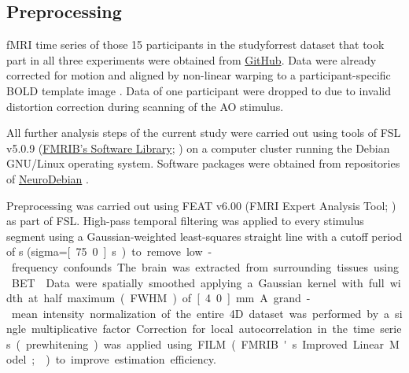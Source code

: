 \documentclass[english]{article}
\begin{document}
\subsection{Preprocessing}


fMRI time series of those 15 participants in the studyforrest dataset that took
part in all three experiments were obtained from
\href{https://github.com/psychoinformatics-de/studyforrest-data-aligned}{GitHub}.
Data were already corrected for motion and aligned by non-linear warping to a
participant-specific BOLD template image \citep{sengupta2016extension}.
Data of one participant were dropped to due to invalid distortion correction
during scanning of the AO stimulus.

All further analysis steps of the current study were carried out using tools of
FSL v5.0.9 (\href{https://www.fmrib.ox.ac.uk/fsl}{FMRIB's Software Library};
\citep{smith2004fsl}) on a computer cluster running the Debian GNU/Linux
operating system. Software packages were obtained from repositories of
\href{http://neuro.debian.net}{NeuroDebian} \citep{halchenko2012open}.

Preprocessing was carried out using FEAT v6.00 (FMRI Expert Analysis Tool;
\citep{woolrich2001autocorr}) as part of FSL.
High-pass temporal filtering was applied to every stimulus segment using a
Gaussian-weighted least-squares straight line with a cutoff period of
\unit[150]{s} (sigma=\unit[75.0]{s}) to remove low-frequency confounds.
The brain was extracted from surrounding tissues using BET \citep{smith2002bet}.
Data were spatially smoothed applying a Gaussian kernel with full width at half
maximum (FWHM) of \unit[4.0]{mm}.
A grand-mean intensity normalization of the entire 4D dataset was performed by a
single multiplicative factor.
Correction for local autocorrelation in the time series (prewhitening) was
applied using FILM (FMRIB's Improved Linear Model; \citep{woolrich2001autocorr})
to improve estimation efficiency.
\end{document}
